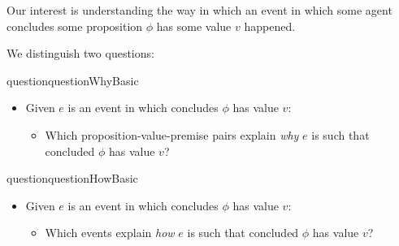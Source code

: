 \begin{note}
  Our interest is understanding the way in which an event in which some agent \vAgent{} concludes some proposition \(\phi\) has some value \(v\) happened.

  We distinguish two questions:

  \begin{restatable}[\qWhy{}]{question}{questionWhyBasic}
    \label{q:why}
    \begin{itemize}
    \item
      Given \(e\) is an event in which \vAgent{} concludes \(\phi\) has value \(v\):
      \begin{itemize}
      \item
        Which proposition-value-premise pairs explain \emph{why} \(e\) is such that \vAgent{} concluded \(\phi\) has value \(v\)?
      \end{itemize}
    \end{itemize}
    \vspace{-\baselineskip}
  \end{restatable}

  \begin{restatable}[\qHow{}]{question}{questionHowBasic}
    \label{q:how}
    \begin{itemize}
    \item
      Given \(e\) is an event in which \vAgent{} concludes \(\phi\) has value \(v\):
      \begin{itemize}
      \item
        Which events explain \emph{how} \(e\) is such that \vAgent{} concluded \(\phi\) has value \(v\)?
      \end{itemize}
    \end{itemize}
    \vspace{-\baselineskip}
  \end{restatable}
\end{note}

